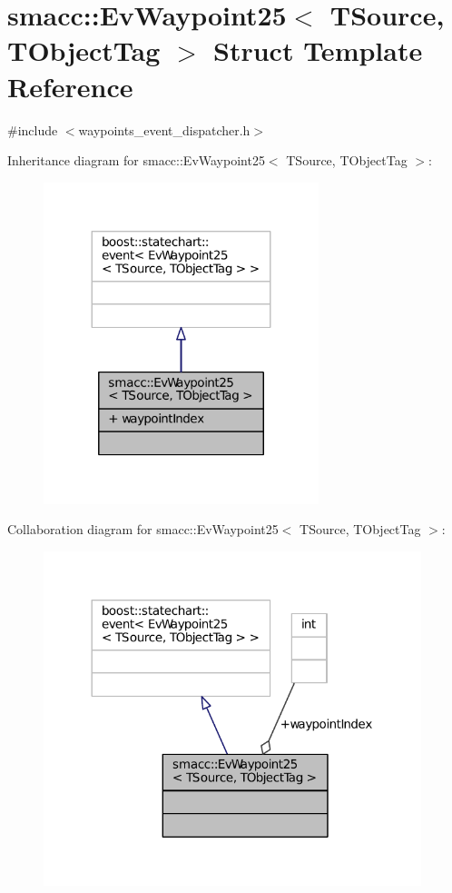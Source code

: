 \hypertarget{structsmacc_1_1EvWaypoint25}{}\section{smacc\+:\+:Ev\+Waypoint25$<$ T\+Source, T\+Object\+Tag $>$ Struct Template Reference}
\label{structsmacc_1_1EvWaypoint25}


{\ttfamily \#include $<$waypoints\+\_\+event\+\_\+dispatcher.\+h$>$}



Inheritance diagram for smacc\+:\+:Ev\+Waypoint25$<$ T\+Source, T\+Object\+Tag $>$\+:
\nopagebreak
\begin{figure}[H]
\begin{center}
\leavevmode
\includegraphics[width=227pt]{structsmacc_1_1EvWaypoint25__inherit__graph}
\end{center}
\end{figure}


Collaboration diagram for smacc\+:\+:Ev\+Waypoint25$<$ T\+Source, T\+Object\+Tag $>$\+:
\nopagebreak
\begin{figure}[H]
\begin{center}
\leavevmode
\includegraphics[width=312pt]{structsmacc_1_1EvWaypoint25__coll__graph}
\end{center}
\end{figure}
